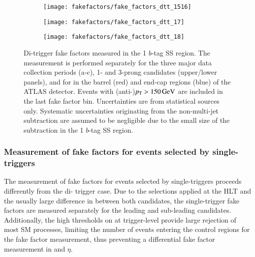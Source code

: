 \begin{figure}[htbp]
  \centering

  \begin{subfigure}{0.495\textwidth}
    \texttt{[image: fakefactors/fake\_factors\_dtt\_1516]}
  \end{subfigure}
  \begin{subfigure}{0.495\textwidth}
    \texttt{[image: fakefactors/fake\_factors\_dtt\_17]}
  \end{subfigure}

  \begin{subfigure}{0.495\textwidth}
    \texttt{[image: fakefactors/fake\_factors\_dtt\_18]}
  \end{subfigure}

  \caption{Di-\tauhadvis trigger fake factors measured in the 1
    $b$-tag SS region. The measurement is performed separately for the
    three major data collection periods (a-c), 1- and 3-prong
    \tauhadvis candidates (upper/lower panels), and for \tauhadvis in
    the barrel (red) and end-cap regions (blue) of the ATLAS
    detector. Events with (anti-)\tauhadvis $p_{\text{T}} > \SI{150}{\ensuremath{\text{GeV}}}$ are
    included in the last fake factor bin. Uncertainties are from
    statistical sources only. Systematic uncertainties originating
    from the non-multi-jet subtraction are assumed to be negligible
    due to the small size of the subtraction in the 1 $b$-tag SS
    region.}%
  \label{fig:mjfakes_fake_factors}
\end{figure}


\subsubsection{Measurement of fake factors for events selected by
  single-\tauhadvis triggers}

The measurement of fake factors for events selected by
single-\tauhadvis triggers proceeds differently from the di-\tauhadvis
trigger case. Due to the selections applied at the HLT and the usually
large difference in \pT between both \tauhadvis candidates, the
single-\tauhadvis trigger fake factors are measured separately for the
leading and sub-leading \tauhadvis candidates. Additionally, the high
\pT thresholds on \tauhadvis at trigger-level provide large rejection
of most SM processes, limiting the number of events entering the
control regions for the fake factor measurement, thus preventing a
differential fake factor measurement in \tauhadvis \pT and $\eta$.

